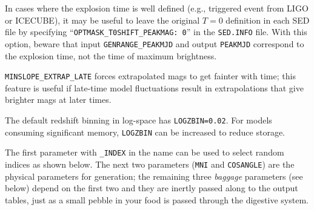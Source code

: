 \documentclass[12pt]{article}
\begin{document}
In cases where the explosion time is well defined 
(e.g., triggered event from LIGO or ICECUBE),
it may be useful to leave the original $T=0$ definition in each
SED file by specifying   ``{\tt OPTMASK\_T0SHIFT\_PEAKMAG: 0}'' 
in the {\tt SED.INFO} file.  With this option,
beware that input {\tt GENRANGE\_PEAKMJD} and output {\tt PEAKMJD} 
correspond to the explosion time, not the time of maximum brightness.

{\tt MINSLOPE\_EXTRAP\_LATE} forces extrapolated mags to get fainter
with time; this feature is useful if late-time model fluctuations
result in extrapolations that give brighter mags at later times.

The default redshift binning in log-space has {\tt LOGZBIN=0.02}.
For models consuming significant memory, {\tt LOGZBIN} can be
increased to reduce storage.

The first parameter with {\tt \_INDEX} in the name can be used
to select random indices as shown below.
The next two parameters ({\tt MNI} and {\tt COSANGLE})
are the physical parameters for generation; the remaining three
{\it baggage} parameters (see below) depend on the first two 
and they are inertly passed along to the output tables, 
just as a small pebble in your food is passed through 
the digestive system.
\end{document}
